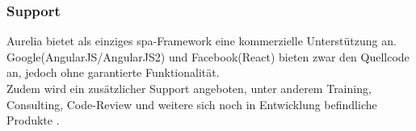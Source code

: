 \subsubsection{Support}
Aurelia bietet als einziges \ac{spa}-Framework eine kommerzielle Unterstützung an. Google(AngularJS/AngularJS2) und Facebook(React) bieten zwar den Quellcode an, jedoch ohne garantierte Funktionalität. \\
Zudem wird ein zusätzlicher Support angeboten, unter anderem Training, Consulting, Code-Review und weitere sich noch in Entwicklung befindliche Produkte \cite{Inc.2016a}.